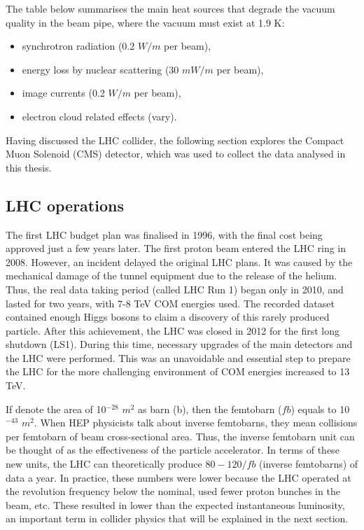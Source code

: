 \begin{normalsize}
The table below summarises the main heat sources that degrade the vacuum quality in the beam pipe, where the vacuum must exist at 1.9 K:


\begin{itemize}
\item synchrotron radiation (0.2 $W/m$ per beam),
\item energy loss by nuclear scattering (30 $mW/m$ per beam),
\item image currents (0.2 $W/m$ per beam),
\item electron cloud related effects (vary).
\end{itemize}



Having discussed the LHC collider, the following section explores the Compact Muon Solenoid (CMS) detector, which was used to collect the data analysed in this thesis. 


\subsection{LHC operations}

The first LHC budget plan was finalised in 1996, with the final cost being approved just a few years later. The first proton beam entered the LHC ring in 2008. However, an incident delayed the original LHC plans. It was caused by the mechanical damage of the tunnel equipment due to the release of the helium. Thus, the real data taking period (called LHC Run 1) began only in 2010, and lasted for two years, with 7-8 TeV COM energies used. The recorded dataset contained enough Higgs bosons to claim a discovery of this rarely produced particle. After this achievement, the LHC was closed in 2012 for the first long shutdown (LS1). During this time, necessary upgrades of the main detectors and the LHC were performed. This was an unavoidable and essential step to prepare the LHC for the more challenging environment of COM energies increased to 13 TeV. 


If denote the area of 10$^{-28}$ $m^2$ as barn (b), then the femtobarn ($fb$) equals to 10$^{-43}$ $m^2$. When HEP physicists talk about inverse femtobarns, they mean collisions per femtobarn of beam cross-sectional area. Thus, the inverse femtobarn unit can be thought of as the effectiveness of the particle accelerator. In terms of these new units, the LHC can theoretically produce $80-120/fb$ (inverse femtobarns) of data a year. In practice, these numbers were lower because the LHC operated at the revolution frequency below the nominal, used fewer proton bunches in the beam, etc.  These resulted in lower than the expected instantaneous luminosity, an important term in collider physics that will be explained in the next section.



\end{normalsize}
